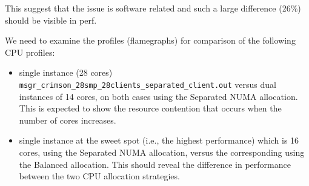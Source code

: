 This suggest that the issue is software related and such a large difference (26\%) should be visible in perf.

We need to examine the profiles (flamegraphs) for comparison of the following CPU profiles:

\begin{itemize}
  \item single instance (28 cores)
    \texttt{msgr\_crimson\_28smp\_28clients\_separated\_client.out} versus dual
    instances of 14 cores, on both cases using the Separated NUMA allocation.
    This is expected to show the resource contention that occurs when the
    number of cores increases.
  \item single instance at the sweet spot (i.e., the highest performance) which
    is 16 cores, using the Separated NUMA allocation, versus the corresponding
    using the Balanced allocation. This should reveal the difference in
    performance between the two CPU allocation strategies.
  \end{itemize}

